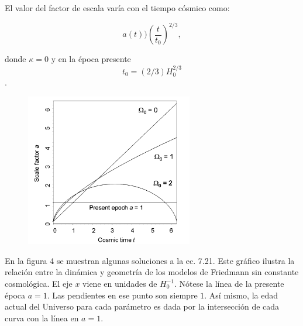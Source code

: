 \documentclass[11pt]{article}
\begin{document}
{{\begin{itemize}
    El valor del factor de escala varía con el tiempo cósmico como:

    \begin{equation}
    a(t) ) \left( \frac{t}{t_0} \right)^{2/3},
    \end{equation} 

    donde $\kappa = 0$ y en la época presente $$t_0 = (2/3) H_0^{2/3}$$.
    
    \end{itemize}

 
    
    
    \begin{figure}               \includegraphics[width=0.65\textwidth]{grafica_scale_factor_timepp219Malcolm.png}
        \caption{}%
    \end{figure}
    
    
       En la figura 4 se muestran algunas soluciones a la ec. 7.21. Este gráfico ilustra la relación entre la dinámica y geometría de los modelos de Friedmann sin constante cosmológica. El eje $x$ viene en unidades de $H_0^{-1}$. Nótese la línea de la presente época $a=1$.  Las pendientes en ese punto son siempre $1$. Así mismo, la edad actual del Universo para cada parámetro es dada por la intersección de cada curva con la línea en $a=1$. 
    

}}
\end{document}
